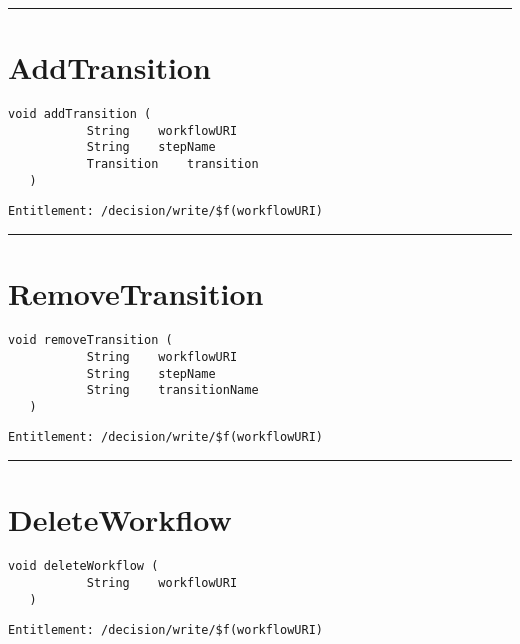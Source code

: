 \rule{12cm}{2pt}
\section{AddTransition}
\label{Api:AddTransition}
\begin{lstlisting}[style=nonumbers]
   void addTransition (
           String    workflowURI
           String    stepName
           Transition    transition
   )
\end{lstlisting}
\begin{Verbatim}[formatcom=\color{Maroon}]
  Entitlement: /decision/write/$f(workflowURI)
\end{Verbatim}



\rule{12cm}{2pt}
\section{RemoveTransition}
\label{Api:RemoveTransition}
\begin{lstlisting}[style=nonumbers]
   void removeTransition (
           String    workflowURI
           String    stepName
           String    transitionName
   )
\end{lstlisting}
\begin{Verbatim}[formatcom=\color{Maroon}]
  Entitlement: /decision/write/$f(workflowURI)
\end{Verbatim}



\rule{12cm}{2pt}
\section{DeleteWorkflow}
\label{Api:DeleteWorkflow}
\begin{lstlisting}[style=nonumbers]
   void deleteWorkflow (
           String    workflowURI
   )
\end{lstlisting}
\begin{Verbatim}[formatcom=\color{Maroon}]
  Entitlement: /decision/write/$f(workflowURI)
\end{Verbatim}




